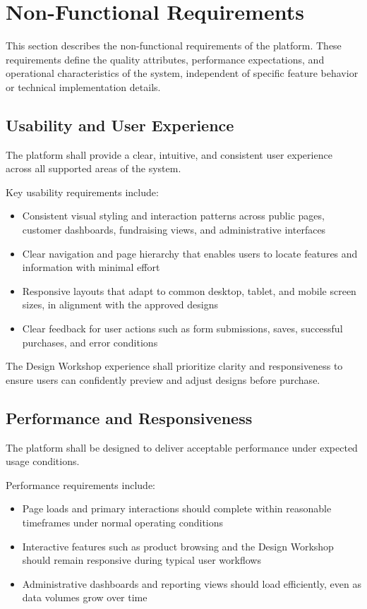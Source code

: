 \section{Non-Functional Requirements}

This section describes the non-functional requirements of the platform. These
requirements define the quality attributes, performance expectations, and
operational characteristics of the system, independent of specific feature
behavior or technical implementation details.

\subsection{Usability and User Experience}

The platform shall provide a clear, intuitive, and consistent user experience
across all supported areas of the system.

Key usability requirements include:
\begin{itemize}[leftmargin=1.5em]
    \item Consistent visual styling and interaction patterns across public pages,
    customer dashboards, fundraising views, and administrative interfaces
    \item Clear navigation and page hierarchy that enables users to locate features
    and information with minimal effort
    \item Responsive layouts that adapt to common desktop, tablet, and mobile
    screen sizes, in alignment with the approved designs
    \item Clear feedback for user actions such as form submissions, saves,
    successful purchases, and error conditions
\end{itemize}

The Design Workshop experience shall prioritize clarity and responsiveness to
ensure users can confidently preview and adjust designs before purchase.

\subsection{Performance and Responsiveness}

The platform shall be designed to deliver acceptable performance under expected
usage conditions.

Performance requirements include:
\begin{itemize}[leftmargin=1.5em]
    \item Page loads and primary interactions should complete within reasonable
    timeframes under normal operating conditions
    \item Interactive features such as product browsing and the Design Workshop
    should remain responsive during typical user workflows
    \item Administrative dashboards and reporting views should load efficiently,
    even as data volumes grow over time
\end{itemize}

